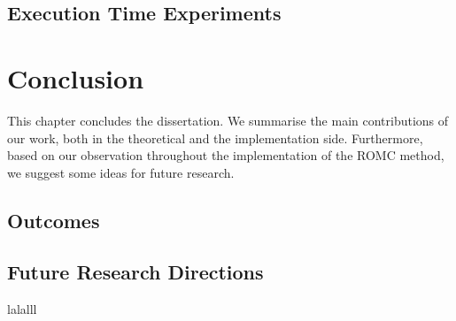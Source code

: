 \documentclass[11pt,twoside]{article}
\numberwithin{Theorem}{section}
\numberwithin{Definition}{section}
\numberwithin{Lemma}{section}
\numberwithin{Algorithm}{section}
\numberwithin{equation}{section}
\begin{document}
\subsection{Execution Time Experiments}
\label{subsec:exec}

\clearpage


\section{Conclusion}

This chapter concludes the dissertation. We summarise the main contributions of our work, both in the theoretical and the implementation side. Furthermore, based on our observation throughout the implementation of the ROMC method, we suggest some ideas for future research.

\subsection{Outcomes}
\label{subsec:outcomes}


\subsection{Future Research Directions}
\label{subsec:future}

\clearpage

lalalll
\printbibliography
\clearpage




\end{document}
